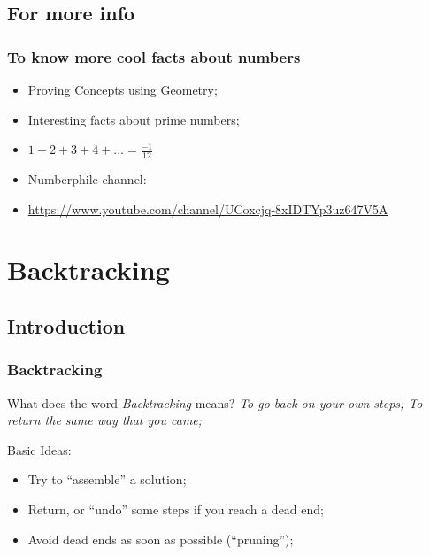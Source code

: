 \documentclass{beamer}
\begin{document}
\subsection{For more info}
\begin{frame}
  \frametitle{To know more cool facts about numbers}
  \begin{block}{}
    \begin{itemize}
    \item Proving Concepts using Geometry;
    \item Interesting facts about prime numbers;
    \item $1 + 2 + 3 + 4 + ... = \frac{-1}{12}$
    \end{itemize}
  \end{block}
  \begin{itemize}
  \item Numberphile channel:
  \item \url{https://www.youtube.com/channel/UCoxcjq-8xIDTYp3uz647V5A}
  \end{itemize}  
\end{frame}

\section{Backtracking}
\subsection{Introduction}

\begin{frame}
  \frametitle{Backtracking}

  \begin{block}{What does the word \emph{Backtracking} means?}
    \emph{To go back on your own steps; To return the same way that
    you came;}
  \end{block}
  \bigskip

  Basic Ideas:
  \begin{itemize}
  \item Try to ``assemble'' a solution;
  \item Return, or ``undo'' some steps if you reach a dead end;
  \item Avoid dead ends as soon as possible (``pruning'');
  \end{itemize}
\end{frame}
\end{document}
